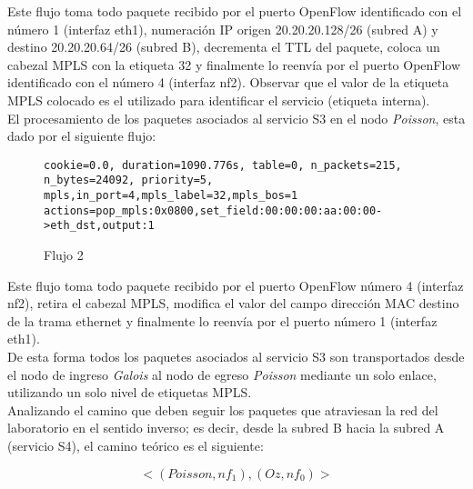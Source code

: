 Este flujo toma todo paquete recibido por el puerto OpenFlow identificado con el n\'umero 1 (interfaz eth1), numeración IP origen 20.20.20.128/26 (subred A) y destino 20.20.20.64/26 (subred B), decrementa el TTL del paquete, coloca un cabezal MPLS con la etiqueta 32 y finalmente lo reenvía por el puerto OpenFlow identificado con el n\'umero 4 (interfaz nf2). Observar que el valor de la etiqueta MPLS colocado es el utilizado para identificar el servicio (etiqueta interna). \\


El procesamiento de los paquetes asociados al servicio S3 en el nodo \textit{Poisson}, esta dado por el siguiente flujo:

\begin{figure}[h]
\texttt{cookie=0.0, duration=1090.776s, table=0, n\_packets=215, \\ 
n\_bytes=24092, priority=5, mpls,in\_port=4,mpls\_label=32,mpls\_bos=1 \\
actions=pop\_mpls:0x0800,set\_field:00:00:00:aa:00:00->eth\_dst,output:1 }
\centering
\caption{Flujo 2}
\label{fig:Flujo2}
\end{figure}

Este flujo toma todo paquete recibido por el puerto OpenFlow n\'umero 4 (interfaz nf2), retira el cabezal MPLS, modifica el valor del campo direcci\'on MAC destino de la trama ethernet y finalmente lo reenvía por el puerto n\'umero 1 (interfaz eth1).\\

De esta forma todos los paquetes asociados al servicio S3 son transportados desde el nodo de ingreso \textit{Galois} al nodo de egreso \textit{Poisson} mediante un solo enlace, utilizando un solo nivel de etiquetas MPLS.\\

Analizando el camino que deben seguir los paquetes que atraviesan la red del laboratorio en el sentido inverso; es decir, desde la subred B hacia la subred A (servicio S4), el camino teórico es el siguiente:

$$<(Poisson, nf_1), (Oz, nf_0)>$$ 

